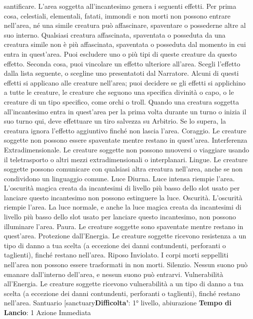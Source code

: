 \begin{multicols}{2}
santificare. L’area soggetta all’incantesimo genera i
seguenti effetti.
Per prima cosa, celestiali, elementali, fatati, immondi e
non morti non possono entrare nell’area, né una simile
creatura può affascinare, spaventare o possederne
altre al suo interno. Qualsiasi creatura affascinata,
spaventata o posseduta da una creatura simile non è
più affascinata, spaventata o posseduta dal momento in
cui entra in quest’area. Puoi escludere uno o più tipi di
queste creature da questo effetto.
Seconda cosa, puoi vincolare un effetto ulteriore
all’area. Scegli l’effetto dalla lista seguente, o scegline
uno presentatoti dal Narratore. Alcuni di questi effetti si
applicano alle creature nell’area; puoi decidere se gli
effetti si applichino a tutte le creature, le creature che
seguono una specifica divinità o capo, o le creature di
un tipo specifico, come orchi o troll. Quando una
creatura soggetta all’incantesimo entra in quest’area
per la prima volta durante un turno o inizia il suo turno
qui, deve effettuare un tiro salvezza su Arbitrio. Se lo
supera, la creatura ignora l’effetto aggiuntivo finché non
lascia l’area.
Coraggio. Le creature soggette non possono essere
spaventate mentre restano in quest’area.
Interferenza Extradimensionale. Le creature soggette
non possono muoversi o viaggiare usando il
teletrasporto o altri mezzi extradimensionali o
interplanari.
Lingue. Le creature soggette possono comunicare con
qualsiasi altra creatura nell’area, anche se non
condividono un linguaggio comune.
Luce Diurna. Luce intensa riempie l’area. L’oscurità
magica creata da incantesimi di livello più basso dello
slot usato per lanciare questo incantesimo non possono
estinguere la luce.
Oscurità. L’oscurità riempie l’area. La luce normale, e
anche la luce magica creata da incantesimi di livello più
basso dello slot usato per lanciare questo incantesimo,
non possono illuminare l’area.
Paura. Le creature soggette sono spaventate mentre
restano in quest’area.
Protezione dall’Energia. Le creature soggette
ricevono resistenza a un tipo di danno a tua scelta (a
eccezione dei danni contundenti, perforanti o taglienti),
finché restano nell’area.
Riposo Inviolato. I corpi morti seppelliti nell’area non
possono essere trasformati in non morti.
Silenzio. Nessun suono può emanare dall’interno
dell’area, e nessun suono può entrarvi.
Vulnerabilità all’Energia. Le creature soggette
ricevono vulnerabilità a un tipo di danno a tua scelta (a
eccezione dei danni contundenti, perforanti o taglienti),
finché restano nell’area.
Santuario
[sanctuary\textbf{Difficolta'}:
1° livello, abiurazione
\textbf{Tempo di Lancio}: 1 Azione Immediata

\end{multicols}
